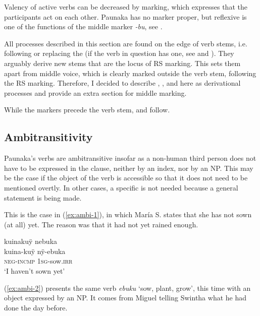 Valency of active verbs can be decreased by  marking, which expresses that the participants act on each other. Paunaka has no  marker proper, but reflexive is one of the functions of the middle marker \textit{-bu}, see . 

All processes described in this section are found on the edge of verb stems, i.e. following or replacing the  (if the verb in question has one, see  and ). They arguably derive new stems that are the locus of RS marking. This sets them apart from middle voice, which is clearly marked outside the verb stem, following the RS marking. Therefore, I decided to describe , , and  here as derivational processes and provide an extra section for middle marking.

While the  markers precede the verb stem,   and  follow.

\subsection{Ambitransitivity}\label{sec:ambitransitivity}

Paunaka’s  verbs are ambitransitive insofar as a non-human third person  does not have to be expressed in the clause, neither by an index, nor by an NP. This may be the case if the object of the verb is accessible so that it does not need to be mentioned overtly. In other cases, a specific  is not needed because a general statement is being made.

This is the case in (\ref{ex:ambi-1}), in which María S. states that she has not sown (at all) yet. The reason was that it had not yet rained enough. 

\ea\label{ex:ambi-1}
\begingl
\glpreamble kuinakuÿ nebuka\\
\gla kuina-kuÿ nÿ-ebuka\\
\glb \textsc{neg}-\textsc{incmp} 1\textsc{sg}-sow.\textsc{irr}\\
\glft ‘I haven’t sown yet’
\endgl
\trailingcitation{[rmx-e150922l.023]}
\xe

(\ref{ex:ambi-2}) presents the same verb \textit{ebuku} ‘sow, plant, grow’, this time with an object expressed by an NP. It comes from Miguel telling Swintha what he had done the day before.

